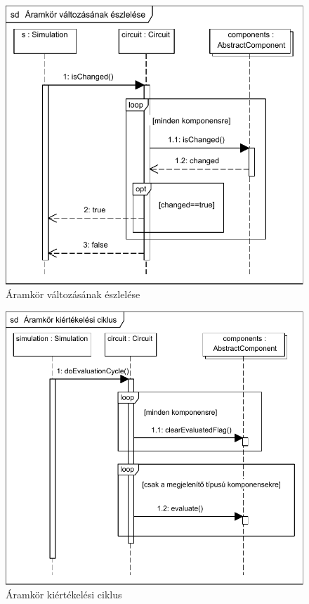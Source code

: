 \begin{figure}[H]
\begin{center}
\includegraphics{chapters/chapter04/seqdiagrams/is_changed.pdf}
\caption{Áramkör változásának észlelése}
\label{fig:is_changed}
\end{center}
\end{figure}

\begin{figure}[H]
\begin{center}
\includegraphics{chapters/chapter04/seqdiagrams/aramkor_szimulacio.pdf}
\caption{Áramkör kiértékelési ciklus}
\label{fig:circuit_sim}
\end{center}
\end{figure}

